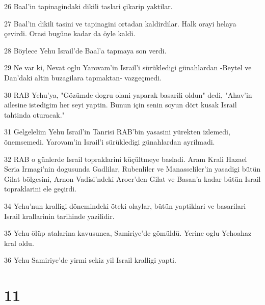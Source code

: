 \par 26 Baal'in tapinagindaki dikili taslari çikarip yaktilar.
\par 27 Baal'in dikili tasini ve tapinagini ortadan kaldirdilar. Halk orayi helaya çevirdi. Orasi bugüne kadar da öyle kaldi.
\par 28 Böylece Yehu Israil'de Baal'a tapmaya son verdi.
\par 29 Ne var ki, Nevat oglu Yarovam'in Israil'i sürükledigi günahlardan -Beytel ve Dan'daki altin buzagilara tapmaktan- vazgeçmedi.
\par 30 RAB Yehu'ya, "Gözümde dogru olani yaparak basarili oldun" dedi, "Ahav'in ailesine istedigim her seyi yaptin. Bunun için senin soyun dört kusak Israil tahtinda oturacak."
\par 31 Gelgelelim Yehu Israil'in Tanrisi RAB'bin yasasini yürekten izlemedi, önemsemedi. Yarovam'in Israil'i sürükledigi günahlardan ayrilmadi.
\par 32 RAB o günlerde Israil topraklarini küçültmeye basladi. Aram Krali Hazael Seria Irmagi'nin dogusunda Gadlilar, Rubenliler ve Manasseliler'in yasadigi bütün Gilat bölgesini, Arnon Vadisi'ndeki Aroer'den Gilat ve Basan'a kadar bütün Israil topraklarini ele geçirdi.
\par 34 Yehu'nun kralligi dönemindeki öteki olaylar, bütün yaptiklari ve basarilari Israil krallarinin tarihinde yazilidir.
\par 35 Yehu ölüp atalarina kavusunca, Samiriye'de gömüldü. Yerine oglu Yehoahaz kral oldu.
\par 36 Yehu Samiriye'de yirmi sekiz yil Israil kralligi yapti.

\chapter{11}

